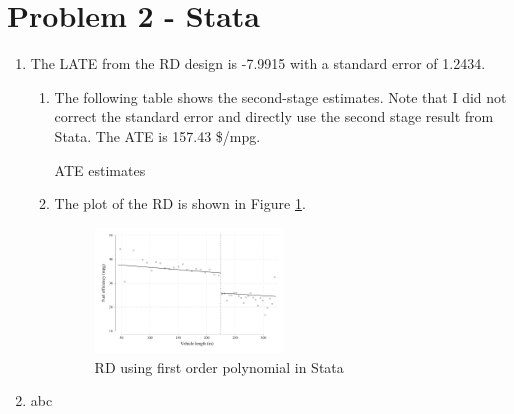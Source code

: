 \documentclass{article}
\begin{document}
\section*{Problem 2 - Stata}
\begin{enumerate}
    \item The LATE from the RD design is -7.9915 with a standard error of 1.2434.
    \begin{enumerate}
        \item The following table shows the second-stage estimates. Note that I did not correct the standard error and directly use the second stage result from Stata. The ATE is 157.43 \$/mpg.
        \begin{table}[H]\centering
            \caption{ATE estimates}
            \label{t:RD_stata}
            \begin{threeparttable}
            
            \end{threeparttable}
            \end{table}
        \item The plot of the RD is shown in Figure \ref{f:RD_stata}.
        \begin{figure}[H]
            \centering
            \includegraphics[width=0.5\textwidth]{./figure/RD.pdf}
            \caption{RD using first order polynomial in Stata}
            \label{f:RD_stata} 
        \end{figure}
    \end{enumerate}
    \item abc
\end{enumerate}
\end{document}
